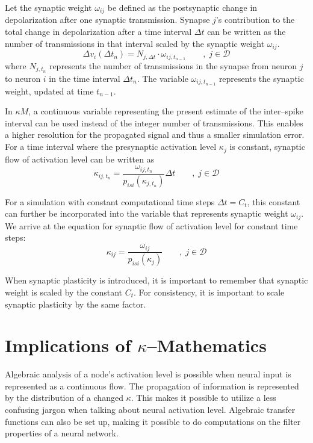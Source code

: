 	Let the synaptic weight $\omega_{ij}$ be defined as the postsynaptic change in depolarization after one synaptic transmission. 	
	Synapse $j$'s contribution to the total change in depolarization after a time interval $\Delta t$ can be written as the number of transmissions in that interval scaled by the synaptic weight $\omega_{ij}$.
	\begin{equation}
		\Delta v_{i}(\Delta t_n) = N_{j,\Delta t}\cdot\omega_{ij, t_{n-1}} \qquad,\; j\in\mathscr{D}
	\end{equation}
	where $N_{j,t_n}$ represents the number of transmissions in the synapse from neuron $j$ to neuron $i$ in the time interval $\Delta t_n$.
	The variable $\omega_{ij,t_{n-1}}$ represents the synaptic weight, updated at time $t_{n-1}$.

	In $\kappa M$, a continuous variable representing the present estimate of the inter--spike interval can be used instead of the integer number of transmissions. 
	This enables a higher resolution for the propagated signal and thus a smaller simulation error.
	For a time interval where the presynaptic activation level $\kappa_j$ is constant, synaptic flow of activation level can be written as
	\begin{equation}
		\kappa_{ij, t_n} = \frac{ \omega_{ij, t_n} }{ p_{isi}(\kappa_{j, t_n}) } \Delta t \qquad,\; j\in\mathscr{D}
	\end{equation}

	For a simulation with constant computational time steps $\Delta t = C_t$, this constant can further be incorporated into the variable that represents synaptic weight $\omega_{ij}$.
	We arrive at the equation for synaptic flow of activation level for constant time steps:
	\begin{equation}
		\kappa_{ij} = \frac{ \omega_{ij} }{ p_{isi}(\kappa_{j})} \qquad,\;j\in\mathscr{D}
		\label{eqSynapticTransmissionForKANN}
	\end{equation}
	
	When synaptic plasticity is introduced, it is important to remember that synaptic weight is scaled by the constant $C_t$.
	For consistency, it is important to scale synaptic plasticity by the same factor.


	\section{Implications of $\kappa$--Mathematics}
		Algebraic analysis of a node's activation level is possible when neural input is represented as a continuous flow.
		The propagation of information is represented by the distribution of a changed $\kappa$.
		This makes it possible to utilize a less confusing jargon when talking about neural activation level.
		Algebraic transfer functions can also be set up, making it possible to do computations on the filter properties of a neural network.

